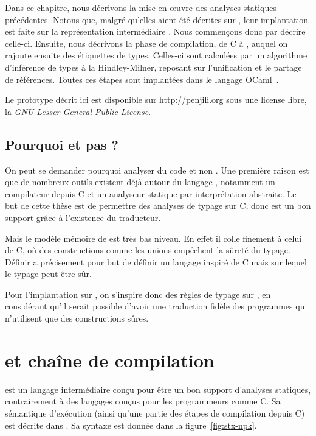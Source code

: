 Dans ce chapitre, nous décrivons la mise en œuvre des analyses statiques
précédentes. Notons que, malgré qu'elles aient été décrites sur \langname, leur
implantation est faite sur la représentation intermédiaire \newspeak. Nous
commençons donc par décrire celle-ci. Ensuite, nous décrivons la phase de
compilation, de C à \newspeak, auquel on rajoute ensuite des étiquettes de
types. Celles-ci sont calculées par un algorithme d'inférence de types à la
Hindley-Milner, reposant sur l'unification et le partage de références. Toutes
ces étapes sont implantées dans le langage OCaml~\cite{DAOC}.

Le prototype décrit ici est disponible sur \url{http://penjili.org} sous une
license libre, la \emph{GNU Lesser General Public License}.

\subsection*{Pourquoi \newspeak et pas \langname?}

On peut se demander pourquoi analyser du code \newspeak et non \langname. Une
première raison est que de nombreux outils existent déjà autour du langage
\newspeak, notamment un compilateur depuis C et un analyseur statique par
interprétation abstraite. Le but de cette thèse est de permettre des analyses de
typage sur C, donc \newspeak est un bon support grâce à l'existence du
traducteur.

Mais le modèle mémoire de \newspeak est très bas niveau. En effet il colle
finement à celui de C, où des constructions comme les unions empêchent la sûreté
du typage. Définir \langname a précisement pour but de définir un langage
inspiré de C mais sur lequel le typage peut être sûr.

Pour l'implantation sur \newspeak, on s'inspire donc des règles de typage sur
\langname, en considérant qu'il serait possible d'avoir une traduction fidèle
des programmes qui n'utilisent que des constructions sûres.



\section{\newspeak et chaîne de compilation}
\label{sec:compil}

\newspeak est un langage intermédiaire conçu pour être un bon support d'analyses
statiques, contrairement à des langages conçus pour les programmeurs comme C. Sa
sémantique d'exécution (ainsi qu'une partie des étapes de compilation depuis C)
est décrite dans \cite{newspeak}. Sa syntaxe est donnée dans la
figure~\ref{fig:stx-npk}.

